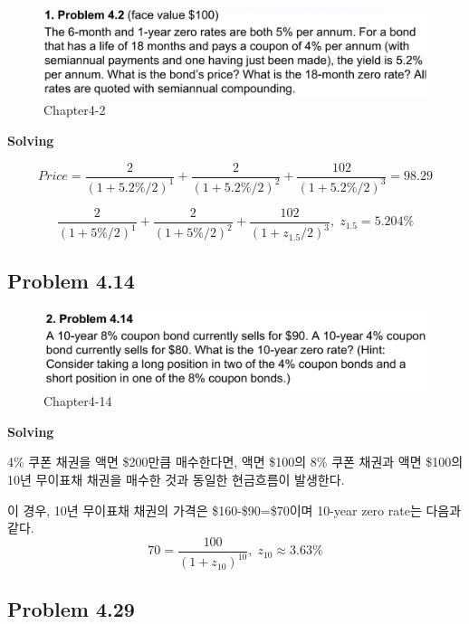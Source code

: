 \documentclass[
  letterpaper,
  DIV=11,
  numbers=noendperiod]{scrreprt}
\begin{document}
\begin{figure}[H]

{\centering \includegraphics{images/선물옵션_4-2.png}

}

\caption{Chapter4-2}

\end{figure}%

\textbf{Solving}

\[Price=\frac{2}{(1+5.2\%/2)^{1}}+\frac{2}{(1+5.2\%/2)^{2}}+\frac{102}{(1+5.2\%/2)^{3}}=98.29\]

\[\frac{2}{(1+5\%/2)^{1}}+\frac{2}{(1+5\%/2)^{2}}+\frac{102}{(1+z_{1.5}/2)^{3}},\;z_{1.5}=5.204\%\]

\subsection*{\texorpdfstring{\textbf{Problem
4.14}}{Problem 4.14}}\label{problem-4.14}

\begin{figure}[H]

{\centering \includegraphics{images/선물옵션_4-14.png}

}

\caption{Chapter4-14}

\end{figure}%

\textbf{Solving}

4\% 쿠폰 채권을 액면 \$200만큼 매수한다면, 액면 \$100의 8\% 쿠폰 채권과
액면 \$100의 10년 무이표채 채권을 매수한 것과 동일한 현금흐름이
발생한다.

이 경우, 10년 무이표채 채권의 가격은 \$160-\$90=\$70이며 10-year zero
rate는 다음과 같다.
\[70=\frac{100}{(1+z_{10})^{10}},\;z_{10}\approx 3.63\%\]

\subsection*{\texorpdfstring{\textbf{Problem
4.29}}{Problem 4.29}}\label{problem-4.29}
\end{document}
